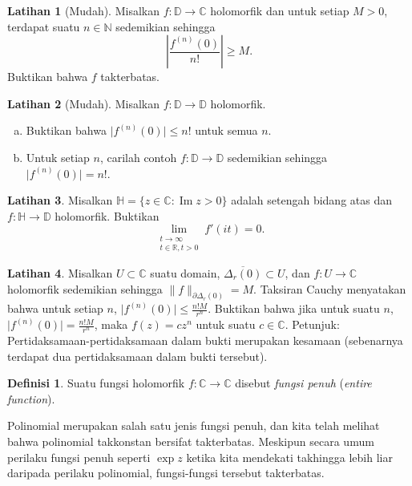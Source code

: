 \documentclass[12pt,openany]{book}
\renewcommand{\Im}{\operatorname{Im}}
\newcommand{\sabs}[1]{\lvert {#1} \rvert}
\newcommand{\snorm}[1]{\lVert {#1} \rVert}
\newcommand{\abs}[1]{\left\lvert {#1} \right\rvert}
\newcommand{\C}{{\mathbb{C}}}
\newcommand{\R}{{\mathbb{R}}}
\newcommand{\N}{{\mathbb{N}}}
\newcommand{\D}{{\mathbb{D}}}
\newcommand{\bH}{{\mathbb{H}}}
\newcommand{\myindex}[1]{#1\index{#1}}
\theoremstyle{plain}
\theoremstyle{remark}
\theoremstyle{definition}
\newtheorem{defn}[thm]{Definisi}
\newenvironment{exbox}{%
    \def\FrameCommand{\vrule width 1pt \relax\hspace{10pt}}%
    \MakeFramed{\advance\hsize-\width\FrameRestore}%
}{%
    \endMakeFramed
}
\newenvironment{exparts}{%
    \leavevmode\begin{enumerate}[a),noitemsep,topsep=0pt,parsep=0pt,partopsep=0pt]
}{%
    \end{enumerate}
}
\theoremstyle{exercise}
\newtheorem{exercise}{Latihan}[section]
\theoremstyle{example}
\begin{document}
\begin{exbox}
\begin{exercise}[Mudah]
Misalkan $f \colon \D \to \C$ holomorfik dan untuk setiap $M > 0$, terdapat
suatu $n \in \N$ sedemikian sehingga
\begin{equation*}
\abs{\frac{f^{(n)}(0)}{n!}} \geq M .
\end{equation*}
Buktikan bahwa $f$ takterbatas.
\end{exercise}

\begin{exercise}[Mudah]
Misalkan $f \colon \D \to \D$ holomorfik.
\begin{exparts}
\item
Buktikan bahwa $\sabs{f^{(n)}(0)}
\leq n!$ untuk semua $n$.
\item
Untuk setiap $n$, carilah contoh $f \colon \D \to \D$ sedemikian sehingga
$\sabs{f^{(n)}(0)} = n!$.
\end{exparts}
\end{exercise}

\begin{exercise}
Misalkan $\bH = \{ z \in \C : \Im z > 0 \}$ adalah setengah bidang atas
dan $f \colon \bH \to \D$ holomorfik.  Buktikan
\begin{equation*}
\lim_{\substack{t \to \infty\\t \in \R, t > 0}} f'(it) = 0 .
\end{equation*}
\end{exercise}

\begin{exercise}
Misalkan $U \subset \C$ suatu domain,
$\overline{\Delta_r(0)} \subset U$, dan
$f \colon U \to \C$ holomorfik sedemikian sehingga
$\snorm{f}_{\partial \Delta_r(0)} = M$.
Taksiran Cauchy menyatakan bahwa untuk setiap $n$,
$\sabs{f^{(n)}(0)} \leq \frac{n! M}{r^n}$.  Buktikan bahwa jika untuk suatu $n$, 
$\sabs{f^{(n)}(0)} = \frac{n! M}{r^n}$, maka $f(z) = c z^n$ untuk suatu $c \in
\C$.  Petunjuk: Pertidaksamaan-pertidaksamaan dalam bukti merupakan kesamaan (sebenarnya terdapat
dua pertidaksamaan dalam bukti tersebut).
\end{exercise}
\end{exbox}

\begin{defn}
Suatu fungsi holomorfik $f \colon \C \to \C$ disebut
\emph{\myindex{fungsi penuh}} (\emph{entire function}).
\end{defn}

Polinomial merupakan salah satu jenis fungsi penuh, dan kita telah melihat bahwa 
polinomial takkonstan bersifat takterbatas.  Meskipun secara umum perilaku
fungsi penuh seperti $\exp z$ ketika kita mendekati takhingga lebih liar daripada perilaku
polinomial, fungsi-fungsi tersebut takterbatas.
\end{document}
